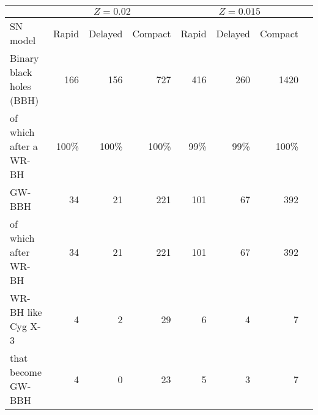 \documentclass{standalone}
\begin{document}
	\begin{tabular}{lrrrrrrr}
		\toprule
		& \multicolumn{3}{c}{$Z=0.02$} & \multicolumn{3}{c}{$Z=0.015$}  \\
		\midrule
		SN model & Rapid & Delayed & Compact&  Rapid & Delayed & Compact\\
		\midrule
		Binary black holes (BBH)  		& 166 & 156 & 727  & 416 & 260 & 1420 \\
		of which after a WR-BH	& 100\% & 100\% &  100\% & 99\% & 99\%&  100\% \\
		\midrule
		GW-BBH  		& 34 & 21 & 221 & 101 & 67 &  392\\
		of which after WR-BH	& 34 & 21 &  221& 101 & 67 &  392\\
		\midrule
		WR-BH like Cyg X-3  	 & 4 & 2 & 29 & 6 & 4 &  7\\
		that become GW-BBH   		 & 4 & 0 & 23 & 5 & 3 & 7 \\
		\bottomrule 	
	\end{tabular}
\end{document}
